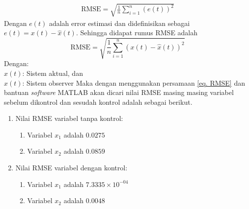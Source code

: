 \documentclass{article}
\begin{document}
\begin{align*}
    \text{RMSE} = \sqrt{\frac{1}{n} \sum_{i=1}^n \left(e(t) \right)^2}
\end{align*}
Dengan $e(t)$ adalah error estimasi dan didefinisikan sebagai $e(t)=x(t) - \hat{x}(t)$. Sehingga didapat rumus RMSE adalah
\begin{equation}
    \text{RMSE} = \sqrt{\frac{1}{n} \sum_{i=1}^n \left( x(t) - \hat{x}(t) \right)^2} \label{eq. RMSE}
\end{equation}
Dengan: \\
$x(t)$: Sistem aktual, dan \\
$\hat{x}(t)$: Sistem observer
Maka dengan menggunakan persamaan \eqref{eq. RMSE} dan bantuan \textit{software} MATLAB akan dicari nilai RMSE masing masing variabel sebelum dikontrol dan sesudah kontrol adalah sebagai berikut.
\begin{enumerate}
    \item Nilai RMSE variabel tanpa kontrol:
          \begin{enumerate}
              \item Variabel $x_1$ adalah $0.0275$
              \item Variabel $x_2$ adalah $0.0859$
          \end{enumerate}
    \item Nilai RMSE variabel dengan kontrol:
          \begin{enumerate}
              \item Variabel $x_1$ adalah $7.3335 \times 10^{-04}$
              \item Variabel $x_2$ adalah $0.0048$
          \end{enumerate}
\end{enumerate}
\end{document}
